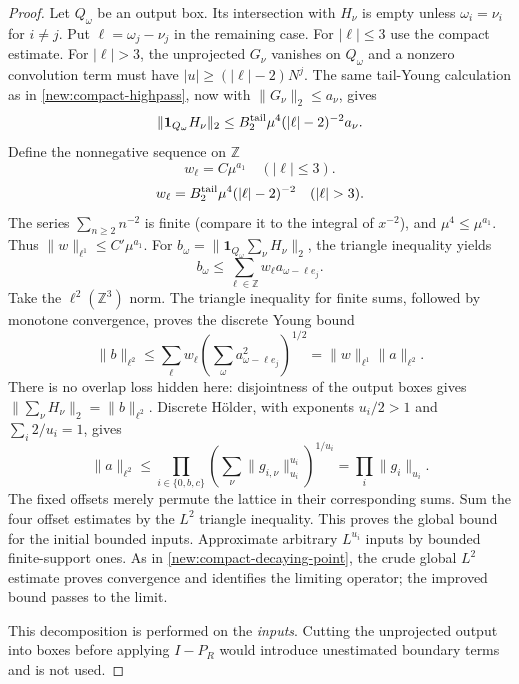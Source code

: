 \documentclass[11pt]{article}
\theoremstyle{definition}
\newcommand{\one}{\mathbf 1}
\begin{document}
\begin{proof}
Let $Q_\omega$ be an output box. Its intersection with $H_\nu$ is empty unless
$\omega_i=\nu_i$ for $i\ne j$. Put $\ell=\omega_j-\nu_j$ in the remaining case.
For $|\ell|\leq3$ use the compact estimate. For $|\ell|>3$, the unprojected $G_\nu$
vanishes on $Q_\omega$ and a nonzero convolution term must have
$|u|\geq(|\ell|-2)N^j$. The same tail-Young calculation as in
\cref{new:compact-highpass}, now with $\|G_\nu\|_2\leq a_\nu$, gives
\[
 \|\one_{Q_\omega}H_\nu\|_2\leq B_2^{\rm tail}\mu^4(|\ell|-2)^{-2}a_\nu.
\]
Define the nonnegative sequence on $\mathbb Z$
\[
 w_\ell=C\mu^{a_1}\quad (|\ell|\leq3).
\]
\[
 w_\ell=B_2^{\rm tail}\mu^4(|\ell|-2)^{-2}\quad (|\ell|>3).
\]
The series $\sum_{n\geq2}n^{-2}$ is finite (compare it to the integral of $x^{-2}$), and
$\mu^4\leq\mu^{a_1}$. Thus $\|w\|_{\ell^1}\leq C'\mu^{a_1}$.
For $b_\omega=\|\one_{Q_\omega}\sum_\nu H_\nu\|_2$, the triangle inequality yields
\[
 b_\omega\leq\sum_{\ell\in\mathbb Z}w_\ell a_{\omega-\ell e_j}.
\]
Take the $\ell^2(\mathbb Z^3)$ norm. The triangle inequality for finite sums, followed by
monotone convergence, proves the discrete Young bound
\[
 \|b\|_{\ell^2}\leq\sum_\ell w_\ell
           \left(\sum_\omega a_{\omega-\ell e_j}^2\right)^{1/2}
 =\|w\|_{\ell^1}\|a\|_{\ell^2}.
\]
There is no overlap loss hidden here: disjointness of the output boxes gives
$\|\sum_\nu H_\nu\|_2=\|b\|_{\ell^2}$. Discrete H\"older, with exponents $u_i/2>1$
and $\sum_i2/u_i=1$, gives
\[
 \|a\|_{\ell^2}\leq
 \prod_{i\in\{0,b,c\}}\left(\sum_\nu\|g_{i,\nu}\|_{u_i}^{u_i}\right)^{1/u_i}
 =\prod_i\|g_i\|_{u_i}.
\]
The fixed offsets merely permute the lattice in their corresponding sums. Sum the four
offset estimates by the $L^2$ triangle inequality. This proves the global bound for the
initial bounded inputs. Approximate arbitrary $L^{u_i}$ inputs by bounded finite-support
ones. As in \cref{new:compact-decaying-point}, the crude global $L^2$ estimate proves
convergence and identifies the limiting operator; the improved bound passes to the limit.

This decomposition is performed on the \emph{inputs}. Cutting the unprojected output into
boxes before applying $I-P_R$ would introduce unestimated boundary terms and is not used.
\end{proof}
\end{document}
